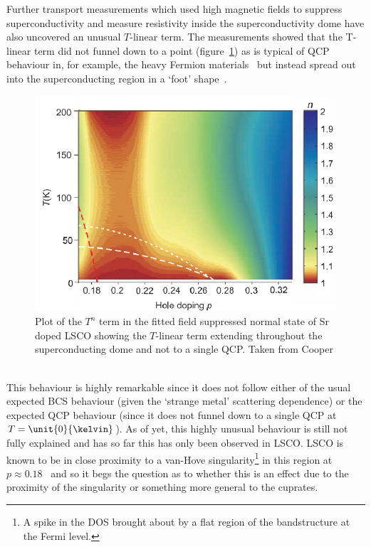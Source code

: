 Further transport measurements which used high magnetic fields to suppress superconductivity and measure resistivity inside the superconductivity dome have also uncovered an unusual $T$-linear term. The measurements showed that the T-linear term did not funnel down to a point (figure~\ref{Fig:Intro:CooperTLinear}) as is typical of \ac{QCP} behaviour in, for example, the heavy Fermion materials~\cite{Custers2003} but instead spread out into the superconducting region in a `foot' shape~\cite{Cooper2009}.
\begin{figure}[htbp]
    \begin{center}
        \includegraphics[scale=0.9]{Chapter-Introduction/Figures/CooperTLinear/CooperTLinear}
        \caption{Plot of the $T^n$ term in the fitted field suppressed normal state of Sr doped \ac{LSCO} showing the $T$-linear term extending throughout the superconducting dome and not to a single \ac{QCP}. Taken from Cooper \etal~\cite{Cooper2009}}
        \label{Fig:Intro:CooperTLinear}
    \end{center}
\end{figure}
This behaviour is highly remarkable since it does not follow either of the usual expected \ac{BCS} behaviour (given the `strange metal' scattering dependence) or the expected \ac{QCP} behaviour (since it does not funnel down to a single \ac{QCP} at $T=\unit{0}{\kelvin}$). As of yet, this highly unusual behaviour is still not fully explained and has so far this has only been observed in \ac{LSCO}. \ac{LSCO} is known to be in close proximity to a van-Hove singularity\footnote{A spike in the \ac{DOS} brought about by a flat region of the bandstructure at the Fermi level.} in this region at $p\approx0.18$~\cite{Hashimoto2008} and so it begs the question as to whether this is an effect due to the proximity of the singularity or something more general to the cuprates.


